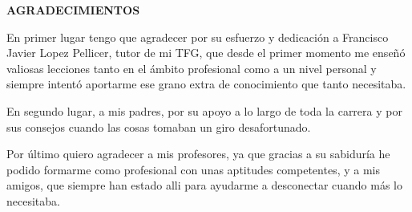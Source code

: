 \begin{center}
{\Large \bfseries AGRADECIMIENTOS}
\vspace{2.5cm}
\end{center}

\par
En primer lugar tengo que agradecer por su esfuerzo y dedicación a Francisco Javier Lopez Pellicer, tutor de mi TFG, que desde el primer momento me enseñó valiosas lecciones tanto en el ámbito profesional como a un nivel personal y siempre intentó aportarme ese grano extra de conocimiento que tanto necesitaba.

\par
En segundo lugar, a mis padres, por su apoyo a lo largo de toda la carrera y por sus consejos cuando las cosas tomaban un giro desafortunado. 

\par 
Por último quiero agradecer a mis profesores, ya que gracias a su sabiduría he podido formarme como profesional con unas aptitudes competentes, y a mis amigos, que siempre han estado alli para ayudarme a desconectar cuando más lo necesitaba. 